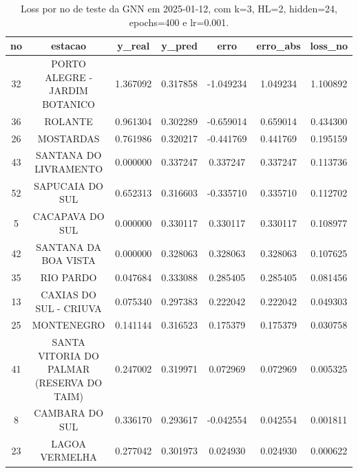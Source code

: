 \begin{table}[h]
\centering
\caption{Loss por no de teste da GNN em 2025-01-12, com k=3, HL=2, hidden=24, epochs=400 e lr=0.001.}
\label{tab:gnn_loss_k3_hl2_h24_e400_d20250112}
\begin{tabular}{ccccccc}
\toprule
no & estacao & y\_real & y\_pred & erro & erro\_abs & loss\_no \\
\midrule
32 & PORTO ALEGRE - JARDIM BOTANICO & 1.367092 & 0.317858 & -1.049234 & 1.049234 & 1.100892 \\
36 & ROLANTE & 0.961304 & 0.302289 & -0.659014 & 0.659014 & 0.434300 \\
26 & MOSTARDAS & 0.761986 & 0.320217 & -0.441769 & 0.441769 & 0.195159 \\
43 & SANTANA DO LIVRAMENTO & 0.000000 & 0.337247 & 0.337247 & 0.337247 & 0.113736 \\
52 & SAPUCAIA DO SUL & 0.652313 & 0.316603 & -0.335710 & 0.335710 & 0.112702 \\
5 & CACAPAVA DO SUL & 0.000000 & 0.330117 & 0.330117 & 0.330117 & 0.108977 \\
42 & SANTANA DA BOA VISTA & 0.000000 & 0.328063 & 0.328063 & 0.328063 & 0.107625 \\
35 & RIO PARDO & 0.047684 & 0.333088 & 0.285405 & 0.285405 & 0.081456 \\
13 & CAXIAS DO SUL - CRIUVA & 0.075340 & 0.297383 & 0.222042 & 0.222042 & 0.049303 \\
25 & MONTENEGRO & 0.141144 & 0.316523 & 0.175379 & 0.175379 & 0.030758 \\
41 & SANTA VITORIA DO PALMAR (RESERVA DO TAIM) & 0.247002 & 0.319971 & 0.072969 & 0.072969 & 0.005325 \\
8 & CAMBARA DO SUL & 0.336170 & 0.293617 & -0.042554 & 0.042554 & 0.001811 \\
23 & LAGOA VERMELHA & 0.277042 & 0.301973 & 0.024930 & 0.024930 & 0.000622 \\
\bottomrule
\end{tabular}
\end{table}

